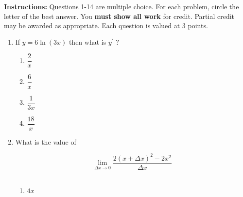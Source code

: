 \documentclass{article}
\begin{document}
\pagestyle{fancy}
\fancyhf{}
\renewcommand{\footrulewidth}{0.4pt}

\noindent
\textbf{Instructions:} Questions 1-14 are multiple choice. For each problem, circle the letter of the best answer.
You \textbf{must show all work} for credit. Partial credit may be awarded as appropriate. Each question is
valued at 3 points.
\begin{enumerate}
	\itemsep2em
	\item
	\begin{minipage}[t]{\linewidth}
		If \(y=6 \ln (3 x)\) then what is \(y^{\prime}\) ?\\[0.1em]
		\begin{enumerate}
		\itemsep1em
			\item  $\dfrac{2}{x}$
			\item  $\dfrac{6}{x}$

			\item  $\dfrac{1}{3x}$
			\item  $\dfrac{18}{x}$
		\end{enumerate}
	\end{minipage}
	\item
	\begin{minipage}[t]{\linewidth}
		What is the value of

\[
\lim _{\Delta x \rightarrow 0} \frac{2(x+\Delta x)^{2}-2 x^{2}}{\Delta x}
\]\\[0.1em]
		\begin{enumerate}
		\itemsep1em
		\item  $4 x$


\end{enumerate}
\end{minipage}
\end{enumerate}
\end{document}
